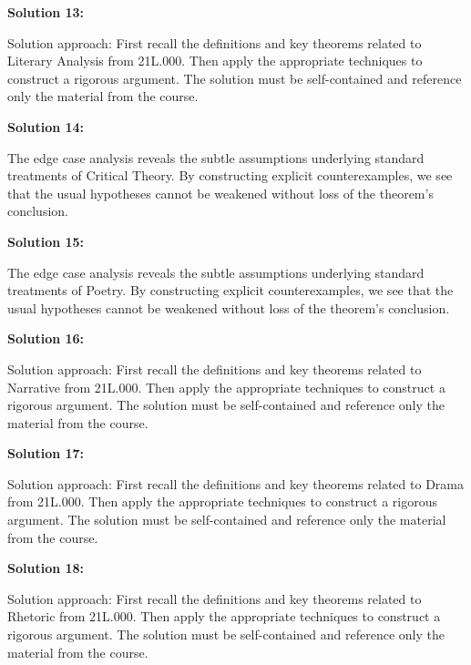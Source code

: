 \documentclass[12pt,a4paper]{exam}
\begin{document}
\vspace{0.5cm}

\textbf{Solution 13:}

Solution approach: First recall the definitions and key theorems related to Literary Analysis from 21L.000. Then apply the appropriate techniques to construct a rigorous argument. The solution must be self-contained and reference only the material from the course.

\vspace{0.5cm}

\textbf{Solution 14:}

The edge case analysis reveals the subtle assumptions underlying standard treatments of Critical Theory. By constructing explicit counterexamples, we see that the usual hypotheses cannot be weakened without loss of the theorem's conclusion.

\vspace{0.5cm}

\textbf{Solution 15:}

The edge case analysis reveals the subtle assumptions underlying standard treatments of Poetry. By constructing explicit counterexamples, we see that the usual hypotheses cannot be weakened without loss of the theorem's conclusion.

\vspace{0.5cm}

\textbf{Solution 16:}

Solution approach: First recall the definitions and key theorems related to Narrative from 21L.000. Then apply the appropriate techniques to construct a rigorous argument. The solution must be self-contained and reference only the material from the course.

\vspace{0.5cm}

\textbf{Solution 17:}

Solution approach: First recall the definitions and key theorems related to Drama from 21L.000. Then apply the appropriate techniques to construct a rigorous argument. The solution must be self-contained and reference only the material from the course.

\vspace{0.5cm}

\textbf{Solution 18:}

Solution approach: First recall the definitions and key theorems related to Rhetoric from 21L.000. Then apply the appropriate techniques to construct a rigorous argument. The solution must be self-contained and reference only the material from the course.
\end{document}
